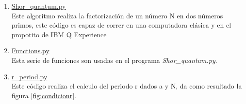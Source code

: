 \begin{enumerate}
    \item \label{cod:shorquanrum} \href{https://github.com/giovannilopez9808/Notas_Agosto_2020/blob/master/AMC/Proyecto_final/Scripts/General/Shor_quantum.py}{Shor\_quantum.py}\\
    Este algoritmo realiza la factorización de un número N en dos números primos, este código es capaz de correr en una computadora clásica y en el propotito de IBM Q Experience
    \item \href{https://github.com/giovannilopez9808/Notas_Agosto_2020/blob/master/AMC/Proyecto_final/Scripts/General/Functions.py}{Functions.py \label{cod:functionsshor}}\\
    Esta serie de funciones son usadas en el programa \textit{Shor\_quantum.py}.
    \item \href{https://github.com/giovannilopez9808/Notas_Agosto_2020/blob/master/AMC/Proyecto_final/Scripts/General/r_period.py}{r\_period.py \label{cod:rperiod}}\\
    Este código realiza el calculo del periodo r dados a y N, da como resultado la figura  \ref{fig:condicionr}.
\end{enumerate}